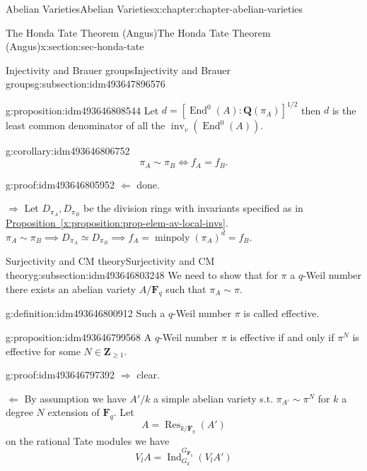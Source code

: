 \documentclass[oneside,10pt,]{book}
\numberwithin{equation}{section}
\newcommand{\lb}{[}
\newcommand{\rb}{]}
\newcommand{\ZZ}{\mathbf{Z}}
\newcommand{\QQ}{\mathbf{Q}}
\newcommand{\FF}{\mathbf{F}}
\DeclareMathOperator{\End}{End}
\DeclareMathOperator{\Ind}{Ind}
\DeclareMathOperator{\Res}{Res}
\begin{document}
\begin{chapterptx}{Abelian Varieties}{}{Abelian Varieties}{}{}{x:chapter:chapter-abelian-varieties}
\begin{sectionptx}{The Honda Tate Theorem (Angus)}{}{The Honda Tate Theorem (Angus)}{}{}{x:section:sec-honda-tate}
\begin{subsectionptx}{Injectivity and Brauer groups}{}{Injectivity and Brauer groups}{}{}{g:subsection:idm493647896576}
\begin{proposition}{}{}{g:proposition:idm493646808544}
Let \(d= \lb \End^0(A) : \QQ(\pi_A) \rb^{1/2}\) then \(d\) is the least common denominator of all the \(\operatorname{inv}_v(\End^0(A))\).%
\end{proposition}
\begin{corollary}{}{}{g:corollary:idm493646806752}%
%
\begin{equation*}
\pi_A\sim \pi_B \iff f_A = f_B\text{.}
\end{equation*}
%
\end{corollary}
\begin{proofptx}{}{g:proof:idm493646805952}
\(\Leftarrow\) done.%
\par
\(\Rightarrow\) Let \(D_{\pi_A} , D_{\pi_B}\) be the division rings with invariants specified as in \hyperref[x:proposition:prop-elem-av-local-invs]{Proposition~\ref{x:proposition:prop-elem-av-local-invs}}. \(\pi_A\sim \pi_B \implies D_{\pi_A} \simeq D_{\pi_B} \implies f_A = \operatorname{minpoly}(\pi_A) ^d = f_B\).%
\end{proofptx}
\end{subsectionptx}
%
%
\typeout{************************************************}
\typeout{************************************************}
%
\begin{subsectionptx}{Surjectivity and CM theory}{}{Surjectivity and CM theory}{}{}{g:subsection:idm493646803248}
We need to show that for \(\pi\) a \(q\)-Weil number there exists an abelian variety \(A/\FF_q\) such that \(\pi_A \sim \pi\).%
\begin{definition}{}{g:definition:idm493646800912}%
Such a \(q\)-Weil number \(\pi\) is called effective.%
\end{definition}
\begin{proposition}{}{}{g:proposition:idm493646799568}%
A \(q\)-Weil number \(\pi\) is effective if and only if \(\pi^N\) is effective for some \(N\in \ZZ_{\ge 1}\).%
\end{proposition}
\begin{proofptx}{}{g:proof:idm493646797392}
\(\Rightarrow\) clear.%
\par
\(\Leftarrow\) By assumption we have \(A'/k\) a simple abelian variety s.t. \(\pi_{A'} \sim  \pi^N\) for \(k\) a degree \(N\) extension of \(\FF_q\). Let%
\begin{equation*}
A = \Res_{k/\FF_q}(A')
\end{equation*}
on the rational Tate modules we have%
\begin{equation*}
V_l A = \Ind_{G_k}^{G_{\FF_q}} (V_lA')
\end{equation*}

\end{proofptx}
\end{subsectionptx}
\end{sectionptx}
\end{chapterptx}
\end{document}
